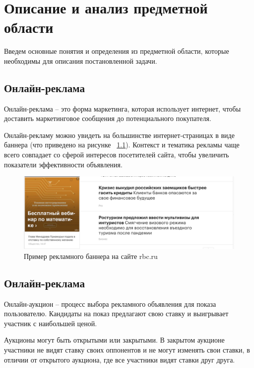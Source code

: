 \documentclass[times,specification,annotation]{itmo-student-thesis}
\begin{document}
\chapter{Описание и анализ предметной области}

Введем основные понятия и определения из предметной области, которые необходимы для описания постановленной задачи.

\section{Онлайн-реклама}

\begin{definition}
    Онлайн-реклама – это форма маркетинга, которая использует интернет,
    чтобы доставить маркетинговое сообщения до потенциального покупателя.
\end{definition}

Онлайн-рекламу можно увидеть на большинстве интернет-страницах в виде баннера (что приведено на рисунке ~\ref{fig:banner}).
Контекст и тематика рекламы чаще всего совпадает со сферой интересов посетителей сайта,
чтобы увеличить показатели эффективности объявления.

\begin{figure}[h]
    \label{fig:banner}
    \caption{Пример рекламного баннера на сайте rbc.ru}
    \centering
    \includegraphics{banner-example.png}
\end{figure}

\section{Онлайн-реклама}

\begin{definition}
    Онлайн-аукцион – процесс выбора рекламного объявления для показа пользователю.
    Кандидаты на показ предлагают свою ставку и выигрывает участник с наибольшей ценой.
\end{definition}

Аукционы могут быть открытыми или закрытыми. 
В закрытом аукционе участники не видят ставку своих оппонентов и не могут изменять свои ставки,
в отличии от открытого аукциона,
где все участники видят ставки друг друга.
\end{document}
